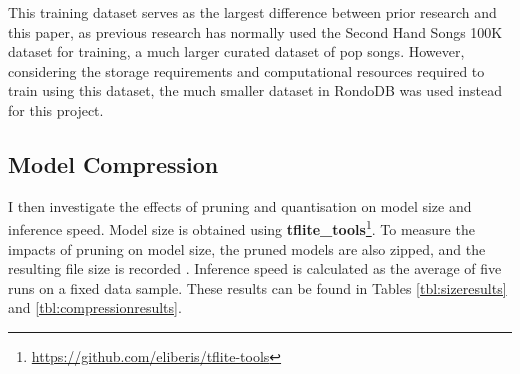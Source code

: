 \documentclass{article}
\begin{document}
{This training dataset serves as the largest difference between prior research and this paper, as previous research has normally used the Second Hand Songs 100K dataset \cite{Xu2018} for training, a much larger curated dataset of pop songs. However, considering the storage requirements and computational resources required to train using this dataset, the much smaller dataset in RondoDB was used instead for this project.

\subsection{Model Compression}\label{sec:evalcomp}
I then investigate the effects of pruning and quantisation on model size and inference speed. Model size is obtained using \textbf{tflite\_tools}\footnote{\href{https://github.com/eliberis/tflite-tools}{https://github.com/eliberis/tflite-tools}}. To measure the impacts of pruning on model size, the pruned models are also zipped, and the resulting file size is recorded \cite{keraspruning}. Inference speed is calculated as the average of five runs on a fixed data sample. These results can be found in Tables \ref{tbl:sizeresults} and \ref{tbl:compressionresults}.

}
\end{document}
